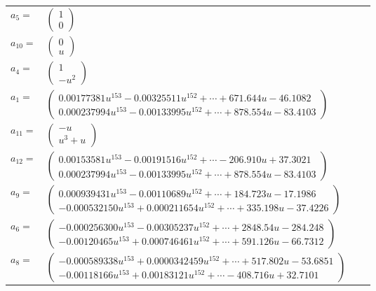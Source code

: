 \documentclass[1p]{elsarticle_modified}
\theoremstyle{definition}
\begin{document}
\begin{tabular}{m{7pt} m{180pt} m{7pt} m{180pt} }
\flushright $a_{5}=$&$\begin{pmatrix}1\\0\end{pmatrix}$ \\
\flushright $a_{10}=$&$\begin{pmatrix}0\\u\end{pmatrix}$ \\
\flushright $a_{4}=$&$\begin{pmatrix}1\\- u^2\end{pmatrix}$ \\
\flushright $a_{1}=$&$\begin{pmatrix}0.00177381 u^{153}-0.00325511 u^{152}+\cdots+671.644 u-46.1082\\0.000237994 u^{153}-0.00133995 u^{152}+\cdots+878.554 u-83.4103\end{pmatrix}$ \\
\flushright $a_{11}=$&$\begin{pmatrix}- u\\u^3+u\end{pmatrix}$ \\
\flushright $a_{12}=$&$\begin{pmatrix}0.00153581 u^{153}-0.00191516 u^{152}+\cdots-206.910 u+37.3021\\0.000237994 u^{153}-0.00133995 u^{152}+\cdots+878.554 u-83.4103\end{pmatrix}$ \\
\flushright $a_{9}=$&$\begin{pmatrix}0.000939431 u^{153}-0.00110689 u^{152}+\cdots+184.723 u-17.1986\\-0.000532150 u^{153}+0.000211654 u^{152}+\cdots+335.198 u-37.4226\end{pmatrix}$ \\
\flushright $a_{6}=$&$\begin{pmatrix}-0.000256300 u^{153}-0.00305237 u^{152}+\cdots+2848.54 u-284.248\\-0.00120465 u^{153}+0.000746461 u^{152}+\cdots+591.126 u-66.7312\end{pmatrix}$ \\
\flushright $a_{8}=$&$\begin{pmatrix}-0.000589338 u^{153}+0.0000342459 u^{152}+\cdots+517.802 u-53.6851\\-0.00118166 u^{153}+0.00183121 u^{152}+\cdots-408.716 u+32.7101\end{pmatrix}$ \\

\end{tabular}
\end{document}
